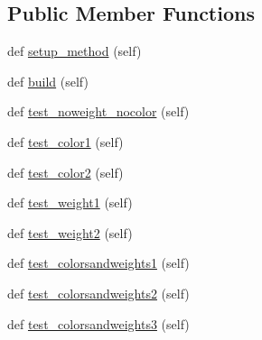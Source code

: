 \subsection*{Public Member Functions}
\begin{DoxyCompactItemize}
\item 
def \hyperlink{classnetworkx_1_1algorithms_1_1isomorphism_1_1tests_1_1test__vf2userfunc_1_1TestNodeMatch__Graph_aca251fbd6e47cebdd3ad962af12701ca}{setup\+\_\+method} (self)
\item 
def \hyperlink{classnetworkx_1_1algorithms_1_1isomorphism_1_1tests_1_1test__vf2userfunc_1_1TestNodeMatch__Graph_a3a22f628055c42cbff616d7b006f844b}{build} (self)
\item 
def \hyperlink{classnetworkx_1_1algorithms_1_1isomorphism_1_1tests_1_1test__vf2userfunc_1_1TestNodeMatch__Graph_aada80b92f60f24877aca5fa24e47b859}{test\+\_\+noweight\+\_\+nocolor} (self)
\item 
def \hyperlink{classnetworkx_1_1algorithms_1_1isomorphism_1_1tests_1_1test__vf2userfunc_1_1TestNodeMatch__Graph_ad94209041235ac2e9877fe2a8d752a38}{test\+\_\+color1} (self)
\item 
def \hyperlink{classnetworkx_1_1algorithms_1_1isomorphism_1_1tests_1_1test__vf2userfunc_1_1TestNodeMatch__Graph_a1a8126ff1d8b803589564c32123f2b9f}{test\+\_\+color2} (self)
\item 
def \hyperlink{classnetworkx_1_1algorithms_1_1isomorphism_1_1tests_1_1test__vf2userfunc_1_1TestNodeMatch__Graph_a5f8479e2b12207401f2c59c31ab48234}{test\+\_\+weight1} (self)
\item 
def \hyperlink{classnetworkx_1_1algorithms_1_1isomorphism_1_1tests_1_1test__vf2userfunc_1_1TestNodeMatch__Graph_ad333cfd2ff1456e6733256d004d1930d}{test\+\_\+weight2} (self)
\item 
def \hyperlink{classnetworkx_1_1algorithms_1_1isomorphism_1_1tests_1_1test__vf2userfunc_1_1TestNodeMatch__Graph_a54187285ec0af14dd068e9e6f07054d2}{test\+\_\+colorsandweights1} (self)
\item 
def \hyperlink{classnetworkx_1_1algorithms_1_1isomorphism_1_1tests_1_1test__vf2userfunc_1_1TestNodeMatch__Graph_a735e91da5fa7fa054b27f6ad7dad8dd9}{test\+\_\+colorsandweights2} (self)
\item 
def \hyperlink{classnetworkx_1_1algorithms_1_1isomorphism_1_1tests_1_1test__vf2userfunc_1_1TestNodeMatch__Graph_a533b038389a8ac935fa76b0fe6cdb8d5}{test\+\_\+colorsandweights3} (self)
\end{DoxyCompactItemize}
